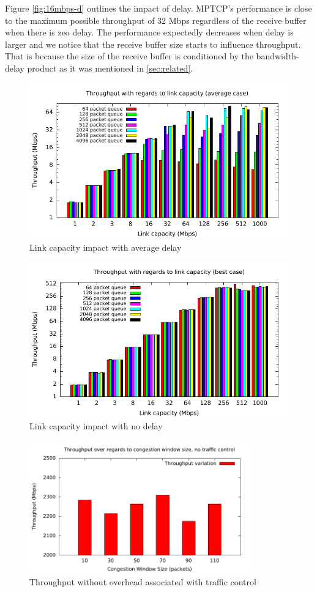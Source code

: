Figure \ref{fig:16mbps-d} outlines the impact of delay. MPTCP's performance is close to the maximum possible throughput of 32 Mbps regardless of the receive buffer when there is zeo delay. The performance expectedly decreases when delay is larger and we notice that the receive buffer size starts to influence throughput. That is because the size of the receive buffer is conditioned by the bandwidth-delay product as it was mentioned in \ref{sec:related}.

\begin{figure}
  \centering
  \includegraphics[width=\textwidth]{img/throughput-bdw-avg}
  \caption{Link capacity impact with average delay}
  \label{fig:bdw-avg}
\end{figure}

\begin{figure}
  \centering
  \includegraphics[width=\textwidth]{img/throughput-bdw-max}
  \caption{Link capacity impact with no delay}
  \label{fig:bdw-max}
\end{figure}

\begin{figure}
  \centering
  \includegraphics[width=0.85\textwidth]{img/throughput-cwnd-notc}
  \caption{Throughput without overhead associated with traffic control}
  \label{fig:cwnd-notc}
\end{figure}

